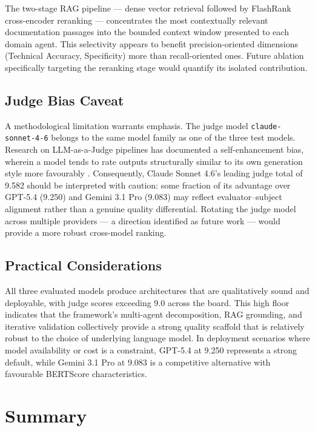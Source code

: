 The two-stage RAG pipeline — dense vector retrieval followed by FlashRank cross-encoder reranking — concentrates the most contextually relevant documentation passages into the bounded context window presented to each domain agent. This selectivity appears to benefit precision-oriented dimensions (Technical Accuracy, Specificity) more than recall-oriented ones. Future ablation specifically targeting the reranking stage would quantify its isolated contribution.

\subsection{Judge Bias Caveat}

A methodological limitation warrants emphasis. The judge model \texttt{claude-sonnet-4-6} belongs to the same model family as one of the three test models. Research on LLM-as-a-Judge pipelines has documented a self-enhancement bias, wherein a model tends to rate outputs structurally similar to its own generation style more favourably \cite{zheng2024judging}. Consequently, Claude Sonnet 4.6's leading judge total of 9.582 should be interpreted with caution: some fraction of its advantage over GPT-5.4 (9.250) and Gemini 3.1 Pro (9.083) may reflect evaluator–subject alignment rather than a genuine quality differential. Rotating the judge model across multiple providers — a direction identified as future work — would provide a more robust cross-model ranking.

\subsection{Practical Considerations}

All three evaluated models produce architectures that are qualitatively sound and deployable, with judge scores exceeding 9.0 across the board. This high floor indicates that the framework's multi-agent decomposition, RAG grounding, and iterative validation collectively provide a strong quality scaffold that is relatively robust to the choice of underlying language model. In deployment scenarios where model availability or cost is a constraint, GPT-5.4 at 9.250 represents a strong default, while Gemini 3.1 Pro at 9.083 is a competitive alternative with favourable BERTScore characteristics.

\section{Summary}

